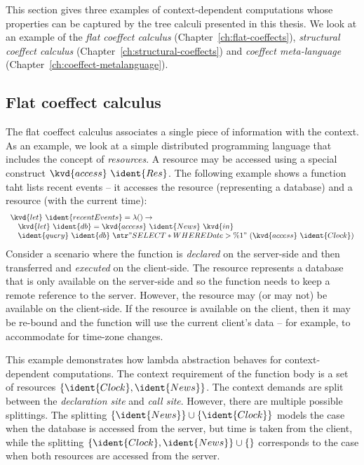 This section gives three examples of context-dependent computations whose properties can be captured
by the tree calculi presented in this thesis. We look at an example of the \emph{flat coeffect calculus} 
(Chapter~\ref{ch:flat-coeffects}), \emph{structural coeffect calculus} (Chapter~\ref{ch:structural-coeffects})
and \emph{coeffect meta-language} (Chapter~\ref{ch:coeffect-metalanguage}).


\subsection{Flat coeffect calculus}

The flat coeffect calculus associates a single piece of information with the context. As an example,
we look at a simple distributed programming language that includes the concept of \emph{resources}.
A resource may be accessed using a special construct $\kvd{access}~\ident{Res}$. The following 
example shows a function taht lists recent events -- it accesses the resource  
(representing a database) and a resource  (with the current time):
%
\begin{equation*}
\begin{array}{l}
\kvd{let}~\ident{recentEvents} = \lambda () \rightarrow\\
\quad\kvd{let}~\ident{db} = \kvd{access}~\ident{News}~\kvd{in}\\
\quad\ident{query}~\ident{db}~\str{"SELECT * WHERE Date > \%1"}~(\kvd{access}~\ident{Clock})
\end{array}
\end{equation*}
%
Consider a scenario where the function is \emph{declared} on the server-side and then
transferred and \emph{executed} on the client-side. The resource  represents a 
database that is only available on the server-side and so the function needs to keep a remote
reference to the server. However, the  resource may (or may not) be available on the
client-side. If the resource is available on the client, then it may be re-bound and the function
will use the current client's data -- for example, to accommodate for time-zone changes.

This example demonstrates how lambda abstraction behaves for context-dependent computations. The 
context requirement of the function body is a set of resources $\{\ident{Clock}, \ident{News}\}$.
The context demands are split between the \emph{declaration site} and \emph{call site}.
However, there are multiple possible splittings. The splitting $\{\ident{News}\} \cup \{\ident{Clock}\}$
models the case when the database is accessed from the server, but time is taken from the client,
while the splitting $\{\ident{Clock}, \ident{News}\} \cup \{\}$ corresponds to the case when both
resources are accessed from the server.

